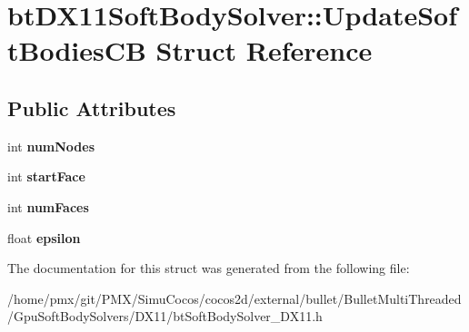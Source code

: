 \hypertarget{structbtDX11SoftBodySolver_1_1UpdateSoftBodiesCB}{}\section{bt\+D\+X11\+Soft\+Body\+Solver\+:\+:Update\+Soft\+Bodies\+CB Struct Reference}
\label{structbtDX11SoftBodySolver_1_1UpdateSoftBodiesCB}
\subsection*{Public Attributes}
\begin{DoxyCompactItemize}
\item 
\mbox{\label{structbtDX11SoftBodySolver_1_1UpdateSoftBodiesCB_af1cdbda5c9886b8c39f080ecb30d32cf}} 
int {\bfseries num\+Nodes}
\item 
\mbox{\label{structbtDX11SoftBodySolver_1_1UpdateSoftBodiesCB_a1302ae486743ee817cfbe664c5ade84f}} 
int {\bfseries start\+Face}
\item 
\mbox{\label{structbtDX11SoftBodySolver_1_1UpdateSoftBodiesCB_a8e50533bbde09468c870d2920575cd81}} 
int {\bfseries num\+Faces}
\item 
\mbox{\label{structbtDX11SoftBodySolver_1_1UpdateSoftBodiesCB_a49daa83937559f4d017c55d4a56a2d0d}} 
float {\bfseries epsilon}
\end{DoxyCompactItemize}


The documentation for this struct was generated from the following file\+:\begin{DoxyCompactItemize}
\item 
/home/pmx/git/\+P\+M\+X/\+Simu\+Cocos/cocos2d/external/bullet/\+Bullet\+Multi\+Threaded/\+Gpu\+Soft\+Body\+Solvers/\+D\+X11/bt\+Soft\+Body\+Solver\+\_\+\+D\+X11.\+h\end{DoxyCompactItemize}
